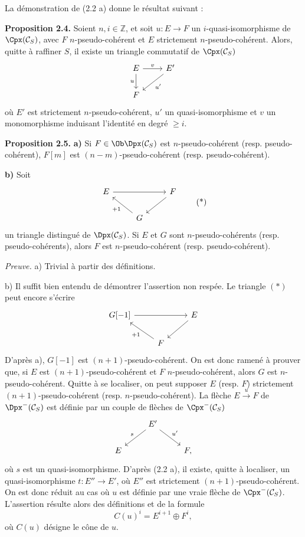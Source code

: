 \documentclass[11pt]{article}
\begin{document}
La démonstration de (2.2 a) donne le résultat suivant :

\textbf{Proposition 2.4.} Soient \(n,i\in\mathbb Z\), et soit \(u:E\to F\) un \(i\)-quasi-isomorphisme de \(\Cpx(\mathcal C_S)\), avec \(F\) \(n\)-pseudo-cohérent et \(E\) strictement \(n\)-pseudo-cohérent. Alors, quitte à raffiner \(S\), il existe un triangle commutatif de \(\Cpx(\mathcal C_S)\)
\[
\begin{tikzcd}
E \arrow[r,"v"] \arrow[d,"u"'] & E' \arrow[dl,"u'"]\\
F &
\end{tikzcd}
\]
où \(E'\) est strictement \(n\)-pseudo-cohérent, \(u'\) un quasi-isomorphisme et \(v\) un monomorphisme induisant l'identité en degré \(\geq i\).

\textbf{Proposition 2.5.} \textbf{a)} Si \(F\in\Ob\Dpx(\mathcal C_S)\) est \(n\)-pseudo-cohérent (resp. pseudo-cohérent), \(F[m]\) est \((n-m)\)-pseudo-cohérent (resp. pseudo-cohérent).

\textbf{b)} Soit
\[
\begin{tikzcd}
E \arrow[rr] && F \arrow[dl]\\
& G \arrow[ul,"+1"] &
\end{tikzcd}
\tag{*}
\]
un triangle distingué de \(\Dpx(\mathcal C_S)\). Si \(E\) et \(G\) sont \(n\)-pseudo-cohérents (resp. pseudo-cohérents), alors \(F\) est \(n\)-pseudo-cohérent (resp. pseudo-cohérent).

\emph{Preuve.} a) Trivial à partir des définitions.

b) Il suffit bien entendu de démontrer l'assertion non respée. Le triangle \((*)\) peut encore s'écrire
\[
\begin{tikzcd}
G[-1] \arrow[rr] && E \arrow[dl]\\
& F \arrow[ul,"+1"] &
\end{tikzcd}
\]
D'après a), \(G[-1]\) est \((n+1)\)-pseudo-cohérent. On est donc ramené à prouver que, si \(E\) est \((n+1)\)-pseudo-cohérent et \(F\) \(n\)-pseudo-cohérent, alors \(G\) est \(n\)-pseudo-cohérent. Quitte à se localiser, on peut supposer \(E\) (resp. \(F\)) strictement \((n+1)\)-pseudo-cohérent (resp. \(n\)-pseudo-cohérent). La flèche \(E\xrightarrow{u}F\) de \(\Dpx^-(\mathcal C_S)\) est définie par un couple de flèches de \(\Cpx^-(\mathcal C_S)\)
\[
\begin{tikzcd}
& E' \arrow[dl,"s"'] \arrow[dr,"u'"]\\
E && F ,
\end{tikzcd}
\]
où \(s\) est un quasi-isomorphisme. D'après (2.2 a), il existe, quitte à localiser, un quasi-isomorphisme \(t:E''\to E'\), où \(E''\) est strictement \((n+1)\)-pseudo-cohérent. On est donc réduit au cas où \(u\) est définie par une vraie flèche de \(\Cpx^-(\mathcal C_S)\). L'assertion résulte alors des définitions et de la formule
\[
  C(u)^i=E^{i+1}\oplus F^i,
\]
où \(C(u)\) désigne le cône de \(u\).
\end{document}

